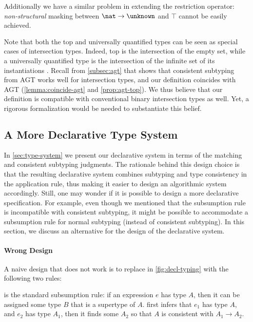 \noindent Additionally we have a similar problem in
extending the restriction operator: \emph{non-structural} masking between
$\nat \to \unknown$ and $\top$ cannot be easily achieved.

Note that both the top and universally quantified types can be seen as special
cases of intersection types. Indeed, top is the intersection of the empty set,
while a universally quantified type is the intersection of the infinite set of
its instantiations \citep{Davies:2000:ITC:351240.351259}. Recall from
\cref{subsec:agt} that \citet{castagna2017gradual} shows that consistent
subtyping from AGT works well for intersection types, and our definition
coincides with AGT (\cref{lemma:coincide-agt} and \cref{prop:agt-top}). We thus
believe that our definition is compatible with conventional binary intersection
types as well. Yet, a rigorous formalization would be needed to substantiate
this belief.


\subsection{A More Declarative Type System}
\label{subsec:variant}

In \cref{sec:type-system} we present our declarative system in terms of the
matching and consistent subtyping judgments. The rationale behind this design
choice is that the resulting declarative system combines subtyping and type
consistency in the application rule, thus making it easier to design an
algorithmic system accordingly. Still, one may wonder if it is possible to
design a more declarative specification. For example, even though we mentioned
that the subsumption rule is incompatible with consistent subtyping, it might be
possible to accommodate a subsumption rule for normal subtyping (instead of
consistent subtyping). In this section, we discuss an alternative for the
design of the declarative system.

\paragraph{Wrong Design}
A naive design that does not work is to replace  in
\cref{fig:decl-typing} with the following two rules:
\begin{mathpar}

\end{mathpar}
 is the standard subsumption rule: if an expression $e$ has type
$A$, then it can be assigned some type $B$ that is a supertype of $A$. 
first infers that $e_1$ has type $A$, and $e_2$ has type $A_1$, then
it finds some $A_2$ so that $A$ is consistent with $A_1 \to A_2$.

